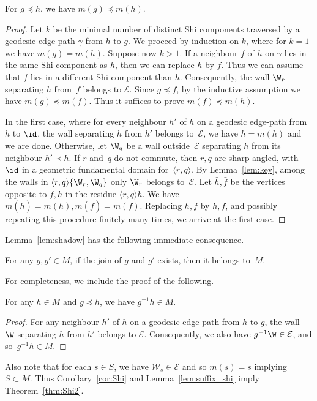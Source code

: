 \begin{lemm} 
	\label{lem:shadow}
	For $g\preceq h$, we have $m(g)\preceq m(h)$.
\end{lemm}
\begin{proof} Let $k$ be the minimal number of distinct Shi components traversed by a geodesic edge-path $\gamma$ from $h$ to $g$. We proceed by induction on $k$, where for $k=1$ we have $m(g)=m(h)$.
	Suppose now $k>1$.
	If a neighbour $f$ of $h$ on $\gamma$ lies in the same Shi component as $h$, then we can replace $h$ by $f$. Thus we can assume that $f$ lies in a different Shi component than $h$. Consequently, the wall $\W_r$ separating $h$ from~$f$ belongs to $\mathcal E$. Since $g\preceq f$, by the inductive assumption we have $m(g)\preceq m(f)$. Thus it suffices to prove $m(f)\preceq m(h)$.
	
	In the first case, where for every neighbour $h'$ of $h$ on a geodesic edge-path from~$h$ to $\id$, the wall separating $h$ from $h'$ belongs to~$\mathcal E$, we have $h=m(h)$ and we are done. Otherwise, let $\W_q$ be a wall outside~$\mathcal E$ separating $h$ from its neighbour $h'\prec h$. 
	If $r$ and~$q$ do not commute, then $r,q$ are sharp-angled, with $\id$
	in a geometric fundamental domain for~$\langle r,q\rangle$. By Lemma~\ref{lem:key}, among the walls in $\langle r,q\rangle\{\W_r,\W_q\}$ only $\W_r$ belongs to~$\mathcal E$. Let $\bar h, \bar f$ be the vertices opposite to $f,h$ in the residue $\langle r,q\rangle h$. We have $m(\bar h)=m(h), m(\bar f)=m(f)$. Replacing $h,f$ by $\bar h,\bar f$, and possibly repeating this procedure finitely many times, we arrive at the first case.
\end{proof}

Lemma~\ref{lem:shadow} has the following immediate consequence.

\begin{coro} 
	\label{cor:Shi}
	For any $g,g'\in M$, if the join of $g$ and $g'$ exists, then it belongs to~$M$. 
\end{coro}

For completeness, we include the proof of the following.

\begin{lemm}[{\cite[Prop 4.16]{DH}}]
	\label{lem:suffix_shi}
	For any $h \in M$ and $g \preceq h$, we have $g^{-1}h \in M$.
\end{lemm}
\begin{proof}
	For any neighbour $h'$ of $h$ on a geodesic edge-path from $h$ to $g$, the wall~$\W$ separating $h$ from $h'$ belongs to $\mathcal E$. Consequently, we also have $g^{-1}\W\in \mathcal E$, and so~$g^{-1}h\in M$. 
\end{proof}

Also note that for each $s\in S$, we have $\mathcal W_s\in \mathcal E$ and so $m(s)=s$ implying $S\subset M$.
Thus Corollary~\ref{cor:Shi} and Lemma~\ref{lem:suffix_shi} imply Theorem~\ref{thm:Shi2}.
